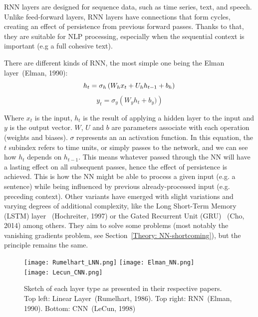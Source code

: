 \documentclass[a4paper, 11pt]{report}
\begin{document}
 RNN layers are designed for sequence data, such as time series, text, and speech. Unlike feed-forward layers, RNN layers have connections that form cycles, creating an effect of persistence from previous forward passes. Thanks to that, they are suitable for NLP processing, especially when the sequential context is important (e.g a full cohesive text).

 There are different kinds of RNN, the most simple one being the Elman layer~\cite{Elman1990_Structure_Time}(Elman, 1990):
\begin{equation*}
    h_t = \sigma_h\left(W_hx_t+U_hh_{t-1}+b_h\right)\\
\end{equation*}
\begin{equation*}
    y_t = \sigma_y\left(W_yh_t+b_y)\right)
\end{equation*}

 Where $x_t$ is the input, $h_t$ is the result of applying a hidden layer to the input and $y$ is the output vector. $W$, $U$ and $b$ are parameters associate with each operation (weights and biases). $\sigma$ represents an an activation function. In this equation, the $t$ subindex refers to time units, or simply passes to the network, and we can see how $h_{t}$ depends on $h_{t-1}$. This means whatever passed through the NN will have a lasting effect on all subsequent passes, hence the effect of persistence is achieved. This is how the NN might be able to process a given input (e.g. a sentence) while being influenced by previous already-processed input (e.g. preceding context).
 Other variants have emerged with slight variations and varying degrees of additional complexity, like the Long Short-Term Memory (LSTM) layer~\cite{Hochreiter1997_LSTM} (Hochreiter, 1997) or the Gated Recurrent Unit (GRU)~\cite{Cho2014_GRU} (Cho, 2014) among others. They aim to solve some problems (most notably the vanishing gradients problem, see Section~\ref{Theory: NN-shortcoming}), but the principle remains the same.

\begin{figure}[ht!]
    \centering
    \texttt{[image: Rumelhart\_LNN.png]}
    \texttt{[image: Elman\_NN.png]}\\
    \texttt{[image: Lecun\_CNN.png]}
    \caption[Sketches of NN]{Sketch of each layer type as presented in their respective papers. Top left: Linear Layer~\cite{Rumelhart1986_Backpropagation}(Rumelhart, 1986). Top right: RNN~\cite{Elman1990_Structure_Time}(Elman, 1990). Bottom: CNN~\cite{LeCun1998_Doc_Recognition}(LeCun, 1998)}
    \label{fig:layers Sketch}
\end{figure}
\end{document}
